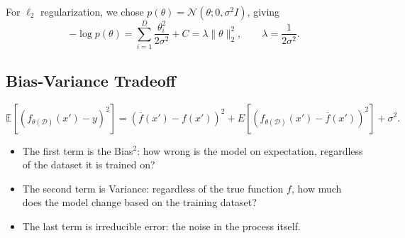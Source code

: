 \documentclass[11pt]{scrartcl}
\let \mc \mathcal
\let \mb \mathbb
\let \bar \overline
\newcommand{\1}{\textbf{1}} %
\begin{document}
For $\ell_2$ regularization, we chose $p(\theta) = \mc N(\theta; 0, \sigma^2 I)$, giving 
$$-\log p(\theta) = \sum_{i=1}^D \frac{\theta_i^2}{2\sigma^2} + C = \lambda \|\theta \|_2^2, \qquad \lambda = \frac{1}{2\sigma^2}.$$

\subsection{Bias-Variance Tradeoff}
$$\mb E[(f_{\theta(\mc D)}(x') - y)^2] = (\bar{f}(x') - f(x'))^2 + E[(f_{\theta(\mc D)}(x') - \bar{f}(x'))^2] + \sigma^2.$$
\begin{itemize}
\item The first term is the Bias$^2$: how wrong is the model on expectation, regardless of the dataset it is trained on?
\item The second term is Variance: regardless of the true function $f$, how much does the model change based on the training dataset?
\item The last term is irreducible error: the noise in the process itself.
\end{itemize}
\end{document}
